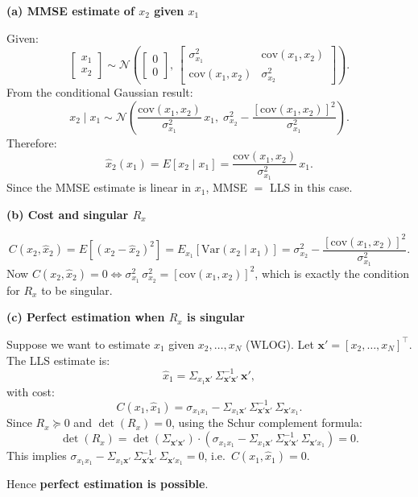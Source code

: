\documentclass[12pt,a4paper,onecolumn]{exam}
\begin{document}
\begin{solution}

\textbf{(a) MMSE estimate of $x_2$ given $x_1$}

Given:
\[
  \begin{bmatrix} x_1 \\ x_2 \end{bmatrix}
  \sim \mathcal{N}\!\left(
    \begin{bmatrix} 0 \\ 0 \end{bmatrix},\,
    \begin{bmatrix} \sigma_{x_1}^2 & \mathrm{cov}(x_1,x_2) \\
                    \mathrm{cov}(x_1,x_2) & \sigma_{x_2}^2 \end{bmatrix}
  \right).
\]
From the conditional Gaussian result:
\[
  x_2 \mid x_1 \sim \mathcal{N}\!\left(
    \frac{\mathrm{cov}(x_1,x_2)}{\sigma_{x_1}^2}\,x_1,\;
    \sigma_{x_2}^2 - \frac{[\mathrm{cov}(x_1,x_2)]^2}{\sigma_{x_1}^2}
  \right).
\]
Therefore:
\[
  \hat{x}_2(x_1) = E[x_2 \mid x_1] = \frac{\mathrm{cov}(x_1,x_2)}{\sigma_{x_1}^2}\,x_1.
\]
Since the MMSE estimate is linear in $x_1$, MMSE $=$ LLS in this case.

\textbf{(b) Cost and singular $R_x$}

\[
  C(x_2,\hat{x}_2) = E[(x_2 - \hat{x}_2)^2]
    = E_{x_1}[\mathrm{Var}(x_2 \mid x_1)]
    = \sigma_{x_2}^2 - \frac{[\mathrm{cov}(x_1,x_2)]^2}{\sigma_{x_1}^2}.
\]
Now $C(x_2,\hat{x}_2) = 0 \iff \sigma_{x_1}^2\,\sigma_{x_2}^2 = [\mathrm{cov}(x_1,x_2)]^2$, which is exactly the condition for $R_x$ to be singular.

\textbf{(c) Perfect estimation when $R_x$ is singular}

Suppose we want to estimate $x_1$ given $x_2, \ldots, x_N$ (WLOG). Let $\mathbf{x}' = [x_2,\ldots,x_N]^\top$. The LLS estimate is:
\[
  \hat{x}_1 = \Sigma_{x_1 \mathbf{x}'}\,\Sigma_{\mathbf{x}'\mathbf{x}'}^{-1}\,\mathbf{x}',
\]
with cost:
\[
  C(x_1,\hat{x}_1) = \sigma_{x_1 x_1} - \Sigma_{x_1\mathbf{x}'}\,\Sigma_{\mathbf{x}'\mathbf{x}'}^{-1}\,\Sigma_{\mathbf{x}'x_1}.
\]
Since $R_x \succeq 0$ and $\det(R_x) = 0$, using the Schur complement formula:
\[
  \det(R_x) = \det(\Sigma_{\mathbf{x}'\mathbf{x}'}) \cdot
    \left(\sigma_{x_1 x_1} - \Sigma_{x_1\mathbf{x}'}\,\Sigma_{\mathbf{x}'\mathbf{x}'}^{-1}\,\Sigma_{\mathbf{x}'x_1}\right) = 0.
\]
This implies $\sigma_{x_1 x_1} - \Sigma_{x_1\mathbf{x}'}\,\Sigma_{\mathbf{x}'\mathbf{x}'}^{-1}\,\Sigma_{\mathbf{x}'x_1} = 0$, i.e.\ $C(x_1,\hat{x}_1) = 0$.

Hence \textbf{perfect estimation is possible}.

\end{solution}
\end{document}
